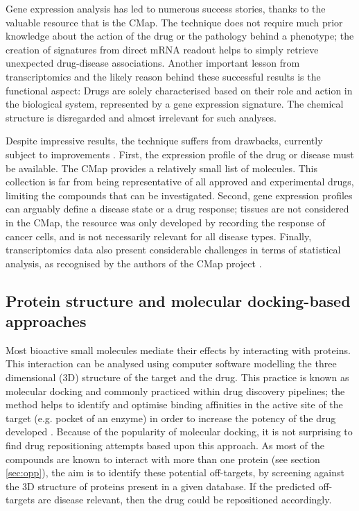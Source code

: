 Gene expression analysis has led to numerous success stories, thanks to the valuable resource that is the CMap. The technique does not require much prior knowledge about the action of the drug or the pathology behind a phenotype; the creation of signatures from direct mRNA readout helps to simply retrieve unexpected drug-disease associations. Another important lesson from transcriptomics and the likely reason behind these successful results is the functional aspect: Drugs are solely characterised based on their role and action in the biological system, represented by a gene expression signature. The chemical structure is disregarded and almost irrelevant for such analyses.

Despite impressive results, the technique suffers from drawbacks, currently subject to improvements \citep{cmap}. First, the expression profile of the drug or disease must be available. The CMap provides a relatively small list of molecules. This collection is far from being representative of all approved and experimental drugs, limiting the compounds that can be investigated. Second, gene expression profiles can arguably define a disease state or a drug response; tissues are not considered in the CMap, the resource was only developed by recording the response of cancer cells, and is not necessarily relevant for all disease types. Finally, transcriptomics data also present considerable challenges in terms of statistical analysis, as recognised by the authors of the CMap project \citep{lamb2006connectivity}.


\subsection{Protein structure and molecular docking-based approaches}

Most bioactive small molecules mediate their effects by interacting with proteins. This interaction can be analysed using computer software modelling the three dimensional (3D) structure of the target and the drug. This practice is known as molecular docking and commonly practiced within drug discovery pipelines; the method helps to identify and optimise binding affinities in the active site of the target (e.g. pocket of an enzyme) in order to increase the potency of the drug developed \citep{haupt2011old}. Because of the popularity of molecular docking, it is not surprising to find drug repositioning attempts based upon this approach. As most of the compounds are known to interact with more than one protein (see section \ref{sec:opp}), the aim is to identify these potential off-targets, by screening against the 3D structure of proteins present in a given database. If the predicted off-targets are disease relevant, then the drug could be repositioned accordingly.

